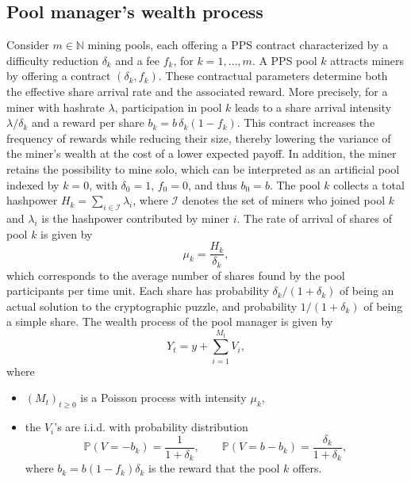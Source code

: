 


\subsection{Pool manager's wealth process}\label{ssec:pool_manager_process}

Consider $m \in \mathbb{N}$ mining pools, each offering a PPS contract characterized by a difficulty reduction $\delta_k$ and a fee $f_k$, for $k = 1, \dots, m$. A PPS pool $k$ attracts miners by offering a contract $(\delta_k, f_k)$.  These contractual parameters determine both the effective share arrival rate and the associated reward. More precisely, for a miner with hashrate $\lambda$, participation in pool $k$ leads to a share arrival intensity $\lambda / \delta_k$ and a reward per share $b_k = b\,\delta_k(1 - f_k)$. This contract increases the frequency of rewards while reducing their size, thereby lowering the variance of the miner’s wealth at the cost of a lower expected payoff. In addition, the miner retains the possibility to mine solo, which can be interpreted as an artificial pool indexed by $k = 0$, with $\delta_0 = 1$, $f_0 = 0$, and thus $b_0 = b$. The pool $k$ collects a total hashpower $H_k = \sum_{i \in \mathcal{I}} \lambda_i$, where $\mathcal{I}$ denotes the set of miners who joined pool $k$ and $\lambda_i$ is the hashpower contributed by miner $i$. The rate of arrival of shares of pool $k$ is given by
\[
    \mu_k = \frac{H_k}{\delta_k},
\]
which corresponds to the average number of shares found by the pool participants per time unit. Each share has probability $\delta_k/(1+\delta_k)$ of being an actual solution to the cryptographic 
puzzle, and probability $1/(1+\delta_k)$ of being a simple share. The wealth process of the pool 
manager is given by
\begin{equation}\label{eq:surplus_pool_manager}
    Y_t = y + \sum_{i=1}^{M_t} V_i,
\end{equation}
where 
\begin{itemize}
    \item $(M_t)_{t\geq 0}$ is a Poisson process with intensity $\mu_k$,
    \item the $V_i$'s are i.i.d. with probability distribution
    \[
        \mathbb{P}\!\left(V = -b_k\right) = \frac{1}{1+\delta_k}, 
        \qquad 
        \mathbb{P}\!\left(V = b - b_k\right) = \frac{\delta_k}{1+\delta_k},
    \]
    where $b_k=b(1-f_k)\delta_k$ is the reward that the pool $k$ offers.
\end{itemize}

